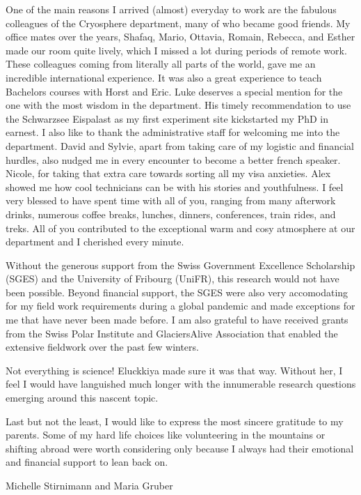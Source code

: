 One of the main reasons I arrived (almost) everyday to work are the fabulous colleagues of the Cryosphere
department, many of who became good friends. My office mates over the years, Shafaq, Mario, Ottavia, Romain,
Rebecca, and Esther made our room quite lively, which I missed a lot during periods of remote work.
These colleagues coming from literally all parts of the world, gave me an incredible international experience.
It was also a great experience to teach Bachelors courses with Horst and Eric. Luke deserves a special mention
for the one with the most wisdom in the department. His timely recommendation to use the Schwarzsee Eispalast as
my first experiment site kickstarted my PhD in earnest. I also like to thank the administrative staff for
welcoming me into the department. David and Sylvie, apart from taking care of my logistic and financial hurdles,
also nudged me in every encounter to become a better french speaker. Nicole, for taking that extra care towards
sorting all my visa anxieties. Alex showed me how cool technicians can be with his stories and youthfulness. I
feel very blessed to have spent time with all of you, ranging from many afterwork drinks, numerous coffee
breaks, lunches, dinners, conferences, train rides, and treks. All of you contributed to the exceptional warm
and cosy atmosphere at our department and I cherished every minute. 

Without the generous support from the Swiss Government Excellence Scholarship (SGES) and the University of
Fribourg (UniFR), this research would not have been possible. Beyond financial support, the SGES were also very
accomodating for my field work requirements during a global pandemic and made exceptions for me that have never
been made before. I am also grateful to have received grants from the Swiss Polar Institute and GlaciersAlive
Association that enabled the extensive fieldwork over the past few winters. 

Not everything is science! Eluckkiya made sure it was that way. Without her, I feel I would have languished much
longer with the innumerable research questions emerging around this nascent topic.

Last but not the least, I would like to express the most sincere gratitude to my parents. Some of my hard life
choices like volunteering in the mountains or shifting abroad were worth considering only because I always had
their emotional and financial support to lean back on.

Michelle Stirnimann and Maria Gruber

